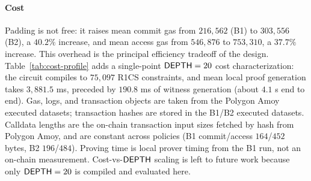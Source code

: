 \paragraph{Cost} Padding is not free: it raises mean commit gas from $216{,}562$ (B1) to $303{,}556$ (B2), a $40.2\%$ increase, and mean access gas from $546{,}876$ to $753{,}310$, a $37.7\%$ increase.
This overhead is the principal efficiency tradeoff of the design.
Table~\ref{tab:cost-profile} adds a single-point $\mathsf{DEPTH}=20$ cost characterization: the circuit compiles to $75{,}097$ R1CS constraints, and mean local proof generation takes $3{,}881.5$ ms, preceded by $190.8$ ms of witness generation (about $4.1$ s end to end).
Gas, logs, and transaction objects are taken from the Polygon Amoy executed datasets; transaction hashes are stored in the B1/B2 executed datasets.
Calldata lengths are the on-chain transaction input sizes fetched by hash from Polygon Amoy, and are constant across policies (B1 commit/access $164$/$452$ bytes, B2 $196$/$484$).
Proving time is local prover timing from the B1 run, not an on-chain measurement.
Cost-vs-$\mathsf{DEPTH}$ scaling is left to future work because only $\mathsf{DEPTH}=20$ is compiled and evaluated here.
